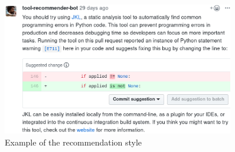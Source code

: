 \begin{figure}[!htbp]
\centering
	\includegraphics[width=0.9\textwidth]{Chapter-5/images/sugg-recommendation.png}
	\caption{Example of the \suggs recommendation style}	
	\label{fig:suggestion-rec} 
\end{figure}
